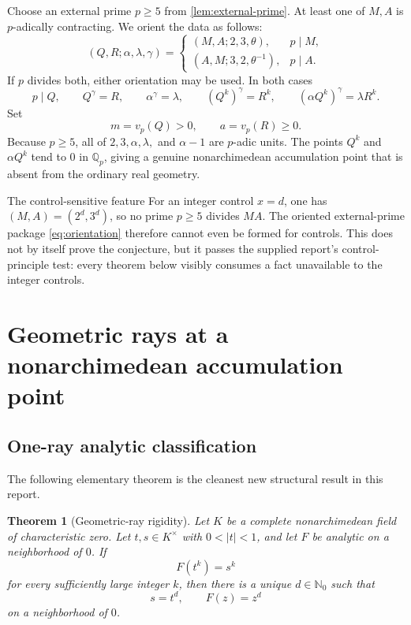 \documentclass[11pt,oneside]{article}
\newtheorem{theorem}{Theorem}[section]
\theoremstyle{definition}
\newcommand{\Nzero}{\mathbb N_0}
\newcommand{\Qp}{\mathbb Q_p}
\newcommand{\vp}{v_p}
\begin{document}
Choose an external prime $p\ge5$ from \cref{lem:external-prime}.  At least one of $M,A$ is
$p$-adically contracting.  We orient the data as follows:
\begin{equation}\label{eq:orientation}
 (Q,R;\alpha,\lambda,\gamma)=
 \begin{cases}
  (M,A;2,3,\theta),&p\mid M,\\
  (A,M;3,2,\theta^{-1}),&p\mid A.
 \end{cases}
\end{equation}
If $p$ divides both, either orientation may be used.  In both cases
\begin{equation}\label{eq:oriented-data}
 p\mid Q,
 \qquad Q^\gamma=R,
 \qquad \alpha^\gamma=\lambda,
 \qquad
 (Q^k)^\gamma=R^k,
 \qquad
 (\alpha Q^k)^\gamma=\lambda R^k.
\end{equation}
Set
\begin{equation}\label{eq:ma-local}
 m=\vp(Q)>0,
 \qquad
 a=\vp(R)\ge0.
\end{equation}
Because $p\ge5$, all of $2,3,\alpha,\lambda,$ and $\alpha-1$ are $p$-adic units.
The points $Q^k$ and $\alpha Q^k$ tend to $0$ in $\Qp$, giving a genuine
nonarchimedean accumulation point that is absent from the ordinary real geometry.

\begin{resultbox}{The control-sensitive feature}
For an integer control $x=d$, one has $(M,A)=(2^d,3^d)$, so no prime $p\ge5$ divides $MA$.
The oriented external-prime package \eqref{eq:orientation} therefore cannot even be formed for
controls.  This does not by itself prove the conjecture, but it passes the supplied report's
control-principle test: every theorem below visibly consumes a fact unavailable to the
integer controls.
\end{resultbox}

\section{Geometric rays at a nonarchimedean accumulation point}
\label{sec:analytic-rigidity}

\subsection{One-ray analytic classification}

The following elementary theorem is the cleanest new structural result in this report.

\begin{theorem}[Geometric-ray rigidity]\label{thm:ray-rigidity}
Let $K$ be a complete nonarchimedean field of characteristic zero.  Let $t,s\in K^\times$
with $0<|t|<1$, and let $F$ be analytic on a neighborhood of $0$.  If
\begin{equation}\label{eq:ray-values}
 F(t^k)=s^k
\end{equation}
for every sufficiently large integer $k$, then there is a unique $d\in\Nzero$ such that
\[
 s=t^d,
 \qquad
 F(z)=z^d
\]
on a neighborhood of $0$.
\end{theorem}
\end{document}
